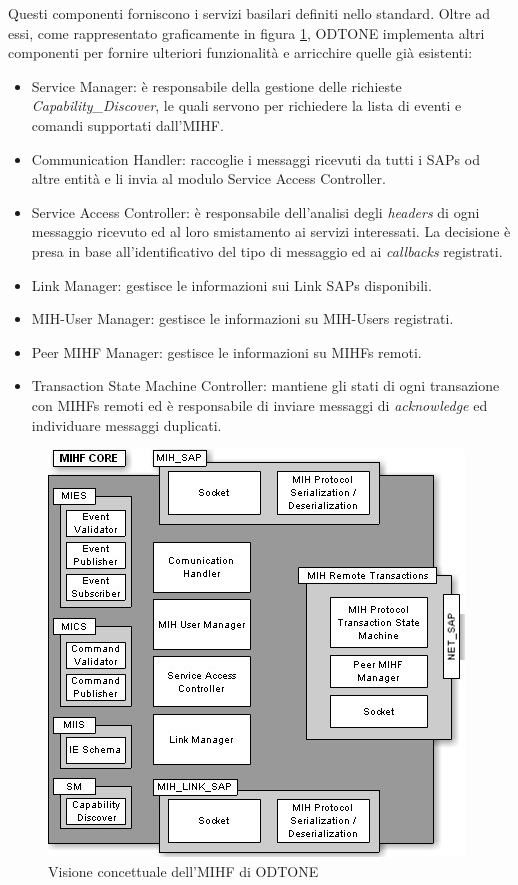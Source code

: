 Questi componenti forniscono i servizi basilari definiti nello standard. Oltre ad essi, come rappresentato graficamente in figura \ref{fig:mihfarch}, ODTONE implementa altri componenti per fornire ulteriori funzionalità e arricchire quelle già esistenti:
\begin{itemize}
\item Service Manager: è responsabile della gestione delle richieste {\em Capability\_Discover}, le quali servono per richiedere la lista di eventi e comandi supportati dall'MIHF.

\item Communication Handler: raccoglie i messaggi ricevuti da tutti i SAPs od altre entità e li invia al modulo Service Access Controller.

\item Service Access Controller: è responsabile dell'analisi degli {\em headers} di ogni messaggio ricevuto ed al loro smistamento ai servizi interessati. La decisione è presa in base all'identificativo del tipo di messaggio ed ai {\em callbacks} registrati.

\item Link Manager: gestisce le informazioni sui Link SAPs disponibili.

\item MIH-User Manager: gestisce le informazioni su MIH-Users registrati.

\item Peer MIHF Manager: gestisce le informazioni su MIHFs remoti.

\item Transaction State Machine Controller: mantiene gli stati di ogni transazione con MIHFs remoti ed è responsabile di inviare messaggi di {\em acknowledge} ed individuare messaggi duplicati.

\end{itemize}

\begin{figure}
\centering
\includegraphics[]{mihfarch.jpg}
\caption{Visione concettuale dell'MIHF di ODTONE}
\label{fig:mihfarch}
\end{figure}

